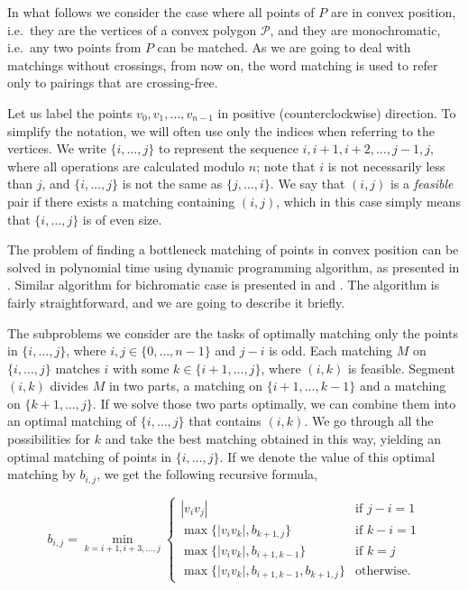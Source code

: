 \documentclass[a4paper, 11pt]{article}
\newcommand{\p}[2]{\{#1, \ldots, #2\}}
\newcommand{\pij}{\p{i}{j}}
\begin{document}
In what follows we consider the case where all points of $P$ are in convex position, i.e.\ they are the vertices of a convex polygon $\mathcal{P}$, and they are monochromatic, i.e.\ any two points from $P$ can be matched.
As we are going to deal with matchings without crossings, from now on, the word matching is used to refer only to pairings that are crossing-free.

Let us label the points $v_0, v_1, \ldots, v_{n-1}$ in positive (counterclockwise) direction. To simplify the notation, we will often use only the indices when referring to the vertices. We write $\pij$ to represent the sequence $i, i+1, i+2, \ldots, j-1, j$, where all operations are calculated modulo $n$; note that $i$ is not necessarily less than $j$, and $\pij$ is not the same as $\p{j}{i}$. We say that $(i,j)$ is a \emph{feasible} pair if there exists a matching containing $(i,j)$, which in this case simply means that $\pij$ is of even size.

The problem of finding a bottleneck matching of points in convex position can be solved in polynomial time using dynamic programming algorithm, as presented in \cite{abu2014bottleneck}. Similar algorithm for bichromatic case is presented in \cite{biniaz2014bottleneck} and \cite{carlsson2015bottleneck}. The algorithm is fairly straightforward, and we are going to describe it briefly.

The subproblems we consider are the tasks of optimally matching only the points in $\pij$, where $i, j\in\p{0}{n-1}$ and $j-i$ is odd. Each matching $M$ on $\pij$ matches $i$ with some $k \in \p{i+1}{j}$, where $(i,k)$ is feasible. Segment $(i,k)$ divides $M$ in two parts, a matching on $\p{i+1}{k-1}$ and a matching on $\p{k+1}{j}$. If we solve those two parts optimally, we can combine them into an optimal matching of $\pij$ that contains $(i,k)$. We go through all the possibilities for $k$ and take the best matching obtained in this way, yielding an optimal matching of points in $\pij$. If we denote the value of this optimal matching by $b_{i,j}$, we get the following recursive formula,

\[
b_{i,j} = \min_{k = i+1, i+3, \ldots, j}
\begin{cases}
	|v_iv_j| & \text{if } j-i = 1 \\
	\max\{|v_iv_k|, b_{k+1,j}\} & \text{if } k-i = 1 \\
	\max\{|v_iv_k|, b_{i+1,k-1}\} & \text{if } k = j \\
	\max\{|v_iv_k|, b_{i+1,k-1}, b_{k+1,j}\} & \text{otherwise}.
\end{cases}
\]
\end{document}
